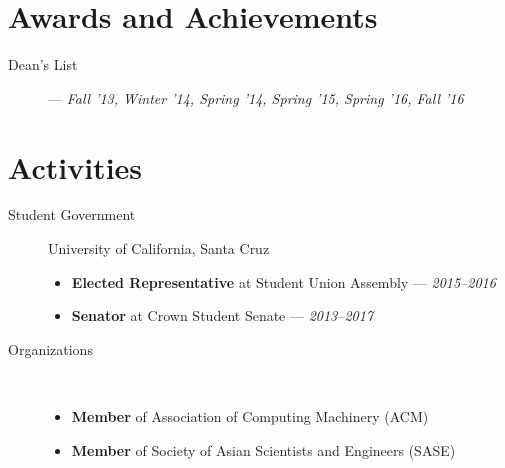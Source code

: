 \documentclass[11pt]{article}
\begin{document}
\section*{Awards and Achievements}
\begin{description}
  \item[Dean's List] --- \textit{Fall '13, Winter '14, Spring '14, Spring '15, Spring '16, Fall '16}
\end{description}

\section*{Activities}
\begin{description}
  \item[Student Government] University of California, Santa Cruz
    \begin{itemize}
      \item \textbf{Elected Representative} at Student Union Assembly ---
        \textit{2015--2016}
      \item \textbf{Senator} at Crown Student Senate --- \textit{2013--2017}
    \end{itemize}
  \item[Organizations] ~
    \begin{itemize}
      \item \textbf{Member} of Association of Computing Machinery (ACM)
      \item \textbf{Member} of Society of Asian Scientists and Engineers (SASE)
    \end{itemize}
\end{description}
\end{document}
